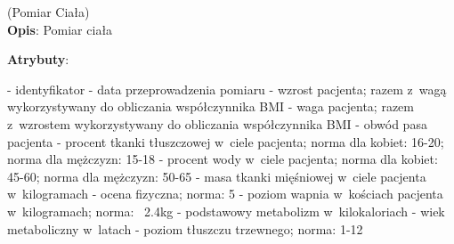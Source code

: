 \begin{enumerate}[label={\textbf{KAT/5/\protect\twodigits{\theenumi}}}, wide, labelwidth=!, labelindent=0pt, labelsep=0pt, series=reqs]
    \label{kat:BodyMeasurement} (Pomiar Ciała)\\
    \indent\textbf{Opis}: Pomiar ciała
    \par
    \textbf{Atrybuty}:
    \begin{itemize}[series=atr, wide, align=left, leftmargin=190pt]
        \label{kat:BodyMeasurement:id}- identyfikator
        \label{kat:BodyMeasurement:completionDate}- data przeprowadzenia pomiaru
        \label{kat:BodyMeasurement:height}- wzrost pacjenta; razem z~wagą wykorzystywany do obliczania współczynnika BMI
        \label{kat:BodyMeasurement:weight}- waga pacjenta; razem z~wzrostem wykorzystywany do obliczania współczynnika BMI
        \label{kat:BodyMeasurement:waist}- obwód pasa pacjenta
        \label{kat:BodyMeasurement:percentOfFatTissue}- procent tkanki tłuszczowej w~ciele pacjenta; norma dla kobiet: 16-20; norma dla mężczyzn: 15-18
        \label{kat:BodyMeasurement:percentOfWater}- procent wody w~ciele pacjenta; norma dla kobiet: 45-60; norma dla mężczyzn: 50-65
        \label{kat:BodyMeasurement:muscleMass}- masa tkanki mięśniowej w~ciele pacjenta w~kilogramach
        \label{kat:BodyMeasurement:physicalMark}- ocena fizyczna; norma: 5
        \label{kat:BodyMeasurement:calciumInBones}- poziom wapnia w~kościach pacjenta w~kilogramach; norma: ~2.4kg
        \label{kat:BodyMeasurement:basicMetabolism}- podstawowy metabolizm w~kilokaloriach
        \label{kat:BodyMeasurement:metabolicAge}- wiek metaboliczny w~latach
        \label{kat:BodyMeasurement:visceralFatLevel}- poziom tłuszczu trzewnego; norma: 1-12
    \end{itemize}


\end{enumerate}
